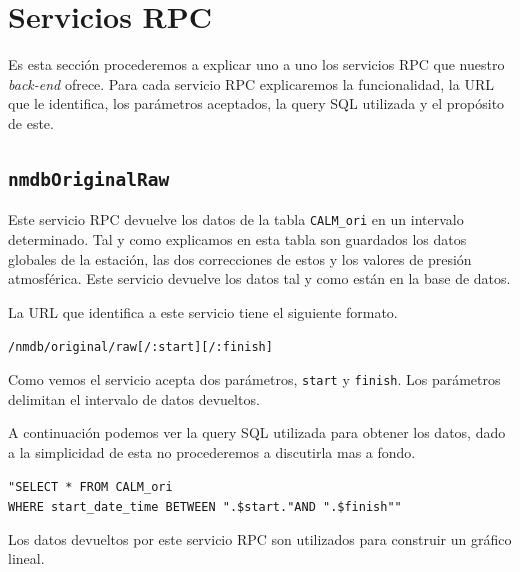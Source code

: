 \section{Servicios RPC}
	Es esta sección procederemos a explicar uno a uno los servicios RPC que nuestro \emph{back-end} ofrece. Para cada servicio RPC explicaremos la
	funcionalidad, la URL que le identifica, los parámetros aceptados, la query SQL utilizada y el propósito de este.
	\subsection{\texttt{nmdbOriginalRaw}}
		Este servicio RPC devuelve los datos de la tabla \texttt{CALM\_ori} en un intervalo determinado. Tal y como explicamos en esta
		tabla son guardados los datos globales de la estación, las dos correcciones de estos y los valores de presión atmosférica. Este servicio
		devuelve los datos tal y como están en la base de datos. 
	  	\par
	  	La URL que identifica a este servicio tiene el siguiente formato.
	  		\begin{center} \texttt{/nmdb/original/raw[/:start][/:finish]}  \end{center} 
		Como vemos el servicio acepta dos parámetros, \texttt{start} y \texttt{finish}. Los parámetros delimitan el intervalo de datos
		devueltos.
		\par
		A continuación podemos ver la query SQL utilizada para obtener los datos, dado a la simplicidad de esta no procederemos a discutirla
		mas a fondo.
	  		\begin{center} \texttt{"SELECT * FROM CALM\_ori 
			  		\\	WHERE start\_date\_time BETWEEN \cc".\$start."\cc AND \cc".\$finish"\cc"}
			\end{center} 
		Los datos devueltos por este servicio RPC son utilizados para construir un gráfico lineal.
